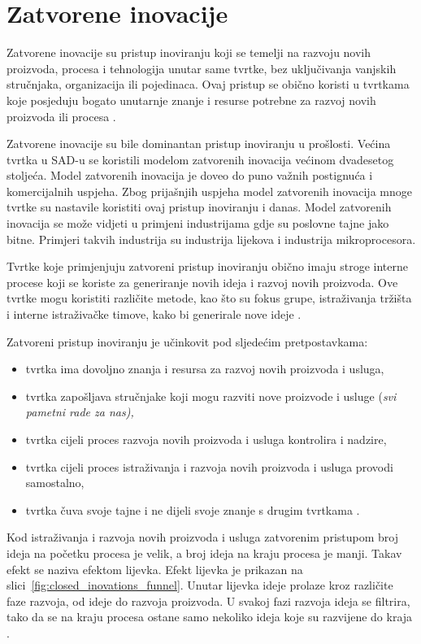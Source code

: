\chapter{Zatvorene inovacije}

Zatvorene inovacije su pristup inoviranju koji se temelji na razvoju novih
proizvoda, procesa i tehnologija unutar same tvrtke, bez uključivanja vanjskih
stručnjaka, organizacija ili pojedinaca. Ovaj pristup se obično koristi u
tvrtkama koje posjeduju bogato unutarnje znanje i resurse potrebne za razvoj
novih proizvoda ili procesa \citep{zatvorenaotvorena2020,openinnovation2003}.

Zatvorene inovacije su bile dominantan pristup inoviranju u prošlosti. Većina
tvrtka u SAD-u se koristili modelom zatvorenih inovacija većinom dvadesetog
stoljeća. Model zatvorenih inovacija je doveo do puno važnih postignuća i
komercijalnih uspjeha. Zbog prijašnjih uspjeha model zatvorenih inovacija mnoge
tvrtke su nastavile koristiti ovaj pristup inoviranju i danas. Model zatvorenih
inovacija se može vidjeti u primjeni industrijama gdje su poslovne tajne jako
bitne. Primjeri takvih industrija su industrija lijekova i industrija
mikroprocesora.


Tvrtke koje primjenjuju zatvoreni pristup inoviranju obično imaju stroge interne
procese koji se koriste za generiranje novih ideja i razvoj novih proizvoda. Ove
tvrtke mogu koristiti različite metode, kao što su fokus grupe, istraživanja
tržišta i interne istraživačke timove, kako bi generirale nove ideje
\citep{zatvorenaotvorena2020,openinnovation2003}.

Zatvoreni pristup inoviranju je učinkovit pod sljedećim pretpostavkama:
\begin{itemize}
    \item tvrtka ima dovoljno znanja i resursa za razvoj novih proizvoda i usluga,
    \item tvrtka zapošljava stručnjake koji mogu razviti nove proizvode i usluge (\it{svi pametni rade za nas}),
    \item tvrtka cijeli proces razvoja novih proizvoda i usluga kontrolira i nadzire,
    \item tvrtka cijeli proces istraživanja i razvoja novih proizvoda i usluga provodi samostalno,
    \item tvrtka čuva svoje tajne i ne dijeli svoje znanje s drugim tvrtkama \citep{zatvorenaotvorena2020,openinnovation2003}.
\end{itemize}

Kod istraživanja i razvoja novih proizvoda i usluga zatvorenim pristupom broj
ideja na početku procesa je velik, a broj ideja na kraju procesa je manji. Takav
efekt se naziva efektom lijevka. Efekt lijevka je prikazan na
slici~\ref{fig:closed_inovations_funnel}. Unutar lijevka ideje prolaze kroz
različite faze razvoja, od ideje do razvoja proizvoda. U svakoj fazi razvoja
ideja se filtrira, tako da se na kraju procesa ostane samo nekoliko ideja koje
su razvijene do kraja \citep{zatvorenaotvorena2020,openinnovation2003}.

